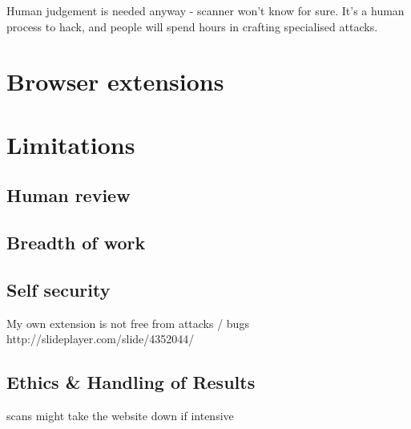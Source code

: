  
 
 Human judgement is needed anyway - scanner won't know for sure. It's a human process to hack, and people will spend hours in crafting specialised attacks. 
\section{Browser extensions}
 
 
 
 
 

 
\section{Limitations}

\subsection{Human review}

 \subsection{Breadth of  work}
 
 \subsection{Self security}
 	 My own extension is not free from attacks / bugs
http://slideplayer.com/slide/4352044/

\subsection{Ethics \& Handling of Results}

scans might take the website down if intensive
 
